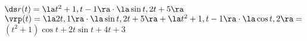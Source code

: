{$\ds r(t) = \la t^2+1, t-1\ra\cdot \la \sin t, 2t+5\ra$
}
{
$\vrp(t) = \la 2t,1\ra \cdot \la \sin t,2t+5\ra + \la t^2+1,t-1\ra\cdot\la \cos t, 2\ra =$\\
 $(t^2+1)\cos t+2t\sin t + 4t+3$
}

